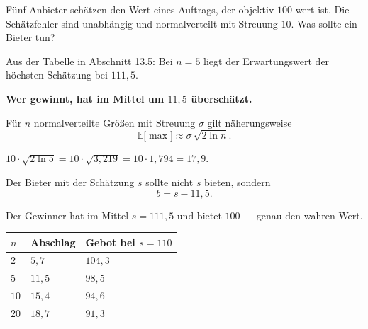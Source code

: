 \begin{aufgabe}
Fünf Anbieter schätzen den Wert eines Auftrags, der objektiv $100$ wert ist. Die Schätzfehler sind unabhängig und normalverteilt mit Streuung $10$. Was sollte ein Bieter tun?

\loesung
{}
Aus der Tabelle in Abschnitt 13.5: Bei $n=5$ liegt der Erwartungswert der höchsten Schätzung bei $111{,}5$.

\begin{center}
\begin{minipage}{0.9\textwidth}
\textbf{Wer gewinnt, hat im Mittel um $11{,}5$ überschätzt.}
\end{minipage}
\end{center}

Für $n$ normalverteilte Größen mit Streuung $\sigma$ gilt näherungsweise
\[ \mathbb{E}\bigl[\max\bigr] \approx \sigma\,\sqrt{2\ln n} . \]

 $10\cdot\sqrt{2\ln 5} = 10\cdot\sqrt{3{,}219} = 10\cdot1{,}794 = 17{,}9$.

\begin{center}
\begin{minipage}{0.86\textwidth}
\end{minipage}
\end{center}

Der Bieter mit der Schätzung $s$ sollte nicht $s$ bieten, sondern
\[ b = s - 11{,}5 . \]

 Der Gewinner hat im Mittel $s = 111{,}5$ und bietet $100$ --- genau den wahren Wert.

\begin{center}
{\small
\renewcommand{\arraystretch}{1.48}
\begin{tabular}{@{}P{1.6cm}P{2.2cm}P{2.6cm}@{}}
\toprule
$n$ & \textbf{Abschlag} & \textbf{Gebot bei $s=110$}\\
\midrule
$2$ & $5{,}7$ & $104{,}3$\\
$5$ & $11{,}5$ & $98{,}5$\\
$10$ & $15{,}4$ & $94{,}6$\\
$20$ & $18{,}7$ & $91{,}3$\\
\bottomrule
\end{tabular}}
\end{center}


\end{aufgabe}

